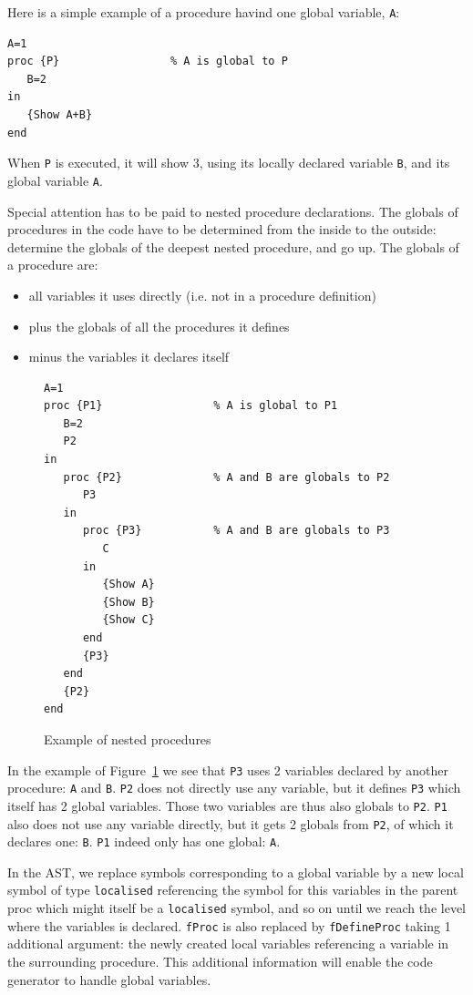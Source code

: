 \documentclass[a4paper]{memoir}
\begin{document}
Here is a simple example of a procedure havind one global variable,
\lstinline!A!:
\begin{lstlisting}
A=1
proc {P}                 % A is global to P
   B=2
in
   {Show A+B}
end
\end{lstlisting}

When \lstinline!P! is executed, it will show 3, using its locally declared
variable \lstinline!B!, and its global variable \lstinline!A!.

Special attention has to be paid to nested procedure declarations.
The globals of procedures in the code have to be determined from the inside to the outside: determine the globals of the deepest nested procedure, and go up. 
The globals of a procedure are:
\begin{itemize}
  \item all variables it uses directly (i.e. not in a procedure definition)
  \item plus the globals of all the procedures it defines
  \item minus the variables it declares itself
\end{itemize}

\begin{figure}[h]
\begin{lstlisting}
A=1
proc {P1}                 % A is global to P1
   B=2
   P2
in
   proc {P2}              % A and B are globals to P2
      P3 
   in
      proc {P3}           % A and B are globals to P3
         C
      in
         {Show A}
         {Show B}
         {Show C}
      end
      {P3}
   end
   {P2}
end
\end{lstlisting}
\caption{Example of nested procedures}
\label{fig:nestedex}
\end{figure}

In the example of Figure~\ref{fig:nestedex} we see that \lstinline!P3! uses 2 variables declared by another procedure: \lstinline!A! and \lstinline!B!. 
\lstinline!P2! does not directly use any variable, but it defines \lstinline!P3! which itself has 2 global variables. Those two variables are thus also globals to \lstinline!P2!.
\lstinline!P1! also does not use any variable directly, but it gets 2 globals from \lstinline!P2!, of which it declares one: \lstinline!B!. \lstinline!P1! indeed only has one global: \lstinline!A!.

In the AST, we replace symbols corresponding to a global
variable by a new local symbol of type \lstinline!localised! referencing the
symbol for this variables in the parent proc which might itself be a
\lstinline!localised! symbol, and so on until we reach the level where the variables is declared.
\lstinline!fProc! is also replaced by
\lstinline!fDefineProc! taking 1 additional argument: the newly created local
variables referencing a variable in the surrounding procedure. This additional
information will enable the code generator to handle global variables.
\end{document}
